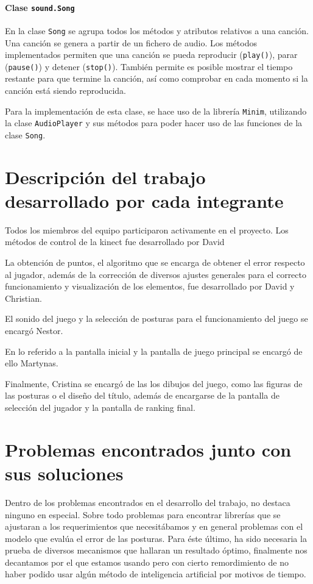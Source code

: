 \documentclass[10pt,a4paper]{report}
\begin{document}
	
	

	\subsubsection{Clase \texttt{sound.Song}}
	En la clase \texttt{Song} se agrupa todos los métodos y atributos relativos a una canción. Una canción se genera a partir de un fichero de audio. Los métodos implementados permiten que una canción se pueda reproducir (\texttt{play()}), parar (\texttt{pause()}) y detener (\texttt{stop()}). También permite es posible mostrar el tiempo restante para que termine la canción, así como comprobar en cada momento si la canción está siendo reproducida.

Para la implementación de esta clase, se hace uso de la librería \texttt{Minim}, utilizando la clase \texttt{AudioPlayer} y sus métodos para poder hacer uso de las funciones de la clase \texttt{Song}.

	

		
	\chapter{Descripción del trabajo desarrollado por cada integrante}
	Todos los miembros del equipo participaron activamente en el proyecto. Los métodos de control de la kinect fue desarrollado por David
	
	La obtención de puntos, el algoritmo que se encarga de obtener el error respecto al jugador, además de la corrección de diversos ajustes generales para el correcto funcionamiento y visualización de los elementos, fue desarrollado por David y Christian.
	
	El sonido del juego y la selección de posturas para el funcionamiento del juego se encargó Nestor.
	
En lo referido a la pantalla inicial y la pantalla de juego principal se encargó de ello Martynas.

Finalmente, Cristina se encargó de las los dibujos del juego, como las figuras de las posturas o el diseño del título, además de encargarse de la pantalla de selección del jugador y la pantalla de ranking final. 

	
	\chapter{Problemas encontrados junto con sus soluciones}	
	Dentro de los problemas encontrados en el desarrollo del trabajo, no destaca ninguno en especial. Sobre todo problemas para encontrar librerías que se ajustaran a los requerimientos que necesitábamos y en general problemas con el modelo que evalúa el error de las posturas. Para éste último, ha sido necesaria la prueba de  diversos mecanismos que hallaran un resultado óptimo, finalmente nos decantamos por el que estamos usando pero con cierto remordimiento de no haber podido usar algún método de inteligencia artificial por motivos de tiempo.
	
	
\end{document}
